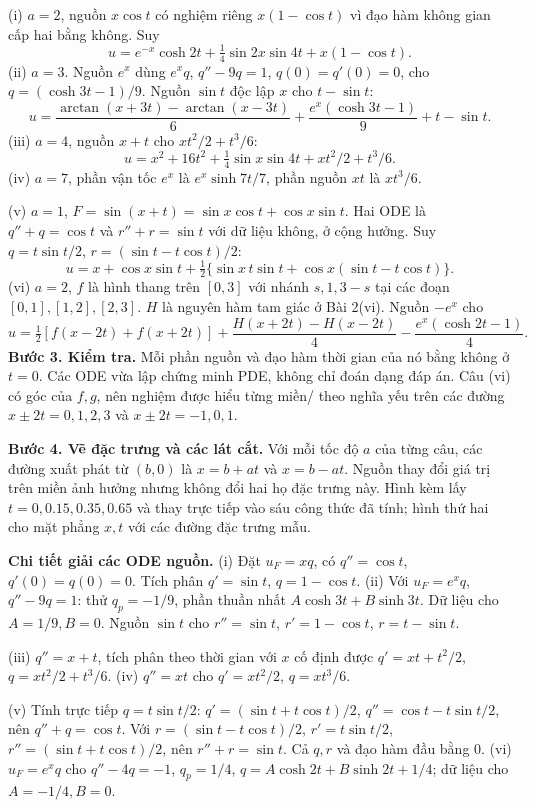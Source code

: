 (i) $a=2$, nguồn $x\cos t$ có nghiệm riêng $x(1-\cos t)$ vì đạo hàm không gian cấp hai bằng không. Suy
\[u=e^{-x}\cosh2t+\tfrac14\sin2x\sin4t+x(1-\cos t).\]
(ii) $a=3$. Nguồn $e^x$ dùng $e^xq$, $q''-9q=1$, $q(0)=q'(0)=0$, cho $q=(\cosh3t-1)/9$. Nguồn $\sin t$ độc lập $x$ cho $t-\sin t$:
\[u=\frac{\arctan(x+3t)-\arctan(x-3t)}6+\frac{e^x(\cosh3t-1)}9+t-\sin t.\]
(iii) $a=4$, nguồn $x+t$ cho $xt^2/2+t^3/6$:
\[u=x^2+16t^2+\tfrac14\sin x\sin4t+xt^2/2+t^3/6.\]
(iv) $a=7$, phần vận tốc $e^x$ là $e^x\sinh7t/7$, phần nguồn $xt$ là $xt^3/6$.

(v) $a=1$, $F=\sin(x+t)=\sin x\cos t+\cos x\sin t$. Hai ODE là $q''+q=\cos t$ và $r''+r=\sin t$ với dữ liệu không, ở cộng hưởng. Suy $q=t\sin t/2$, $r=(\sin t-t\cos t)/2$:
\[u=x+\cos x\sin t+\tfrac12\{\sin x\,t\sin t+\cos x(\sin t-t\cos t)\}.\]
(vi) $a=2$, $f$ là hình thang trên $[0,3]$ với nhánh $s,1,3-s$ tại các đoạn $[0,1],[1,2],[2,3]$. $H$ là nguyên hàm tam giác ở Bài 2(vi). Nguồn $-e^x$ cho
\[u=\tfrac12[f(x-2t)+f(x+2t)]+\frac{H(x+2t)-H(x-2t)}4-\frac{e^x(\cosh2t-1)}4.\]
\textbf{Bước 3. Kiểm tra.} Mỗi phần nguồn và đạo hàm thời gian của nó bằng không ở $t=0$. Các ODE vừa lập chứng minh PDE, không chỉ đoán dạng đáp án. Câu (vi) có góc của $f,g$, nên nghiệm được hiểu từng miền/ theo nghĩa yếu trên các đường $x\pm2t=0,1,2,3$ và $x\pm2t=-1,0,1$.

\textbf{Bước 4. Vẽ đặc trưng và các lát cắt.} Với mỗi tốc độ $a$ của từng câu, các đường xuất phát từ $(b,0)$ là $x=b+at$ và $x=b-at$. Nguồn thay đổi giá trị trên miền ảnh hưởng nhưng không đổi hai họ đặc trưng này. Hình kèm lấy $t=0,0.15,0.35,0.65$ và thay trực tiếp vào sáu công thức đã tính; hình thứ hai cho mặt phẳng $x,t$ với các đường đặc trưng mẫu.

\textbf{Chi tiết giải các ODE nguồn.} (i) Đặt $u_F=xq$, có $q''=\cos t$, $q'(0)=q(0)=0$. Tích phân $q'=\sin t$, $q=1-\cos t$. (ii) Với $u_F=e^xq$, $q''-9q=1$: thử $q_p=-1/9$, phần thuần nhất $A\cosh3t+B\sinh3t$. Dữ liệu cho $A=1/9,B=0$. Nguồn $\sin t$ cho $r''=\sin t$, $r'=1-\cos t$, $r=t-\sin t$.

(iii) $q''=x+t$, tích phân theo thời gian với $x$ cố định được $q'=xt+t^2/2$, $q=xt^2/2+t^3/6$. (iv) $q''=xt$ cho $q'=xt^2/2$, $q=xt^3/6$.

(v) Tính trực tiếp $q=t\sin t/2$: $q'=(\sin t+t\cos t)/2$, $q''=\cos t-t\sin t/2$, nên $q''+q=\cos t$. Với $r=(\sin t-t\cos t)/2$, $r'=t\sin t/2$, $r''=(\sin t+t\cos t)/2$, nên $r''+r=\sin t$. Cả $q,r$ và đạo hàm đầu bằng $0$. (vi) $u_F=e^xq$ cho $q''-4q=-1$, $q_p=1/4$, $q=A\cosh2t+B\sinh2t+1/4$; dữ liệu cho $A=-1/4,B=0$.

